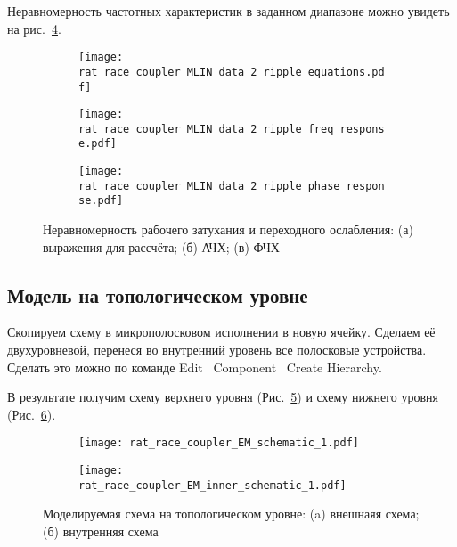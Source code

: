 Неравномерность частотных характеристик в заданном диапазоне можно увидеть на рис.~\ref{fig:rat_race_coupler_MLIN_data_2_response_ripple}.

\begin{figure}[!ht]
    \centering
    \begin{subfigure}[b]{0.4\textwidth}
        \centering
        \texttt{[image: rat\_race\_coupler\_MLIN\_data\_2\_ripple\_equations.pdf]}
        \caption{}%
    \label{fig:rat_race_coupler_MLIN_data_2_ripple_equations}
    \end{subfigure}
    \vfill
    \begin{subfigure}[b]{0.40\textwidth}
        \centering
        \texttt{[image: rat\_race\_coupler\_MLIN\_data\_2\_ripple\_freq\_response.pdf]}
        \caption{}%
    \label{fig:rat_race_coupler_MLIN_data_2_ripple_freq_response}
    \end{subfigure}
    \hfill
    \begin{subfigure}[b]{0.50\textwidth}
        \centering
        \texttt{[image: rat\_race\_coupler\_MLIN\_data\_2\_ripple\_phase\_response.pdf]}
        \caption{}%
    \label{fig:rat_race_coupler_MLIN_data_2_ripple_phase_response}
    \end{subfigure}
    \caption{%
        Неравномерность рабочего затухания и переходного ослабления:
        (а) выражения для рассчёта;
        (б) АЧХ;
        (в) ФЧХ
    }%
    \label{fig:rat_race_coupler_MLIN_data_2_response_ripple}
\end{figure}

\subsection{Модель на топологическом уровне}

Скопируем схему в микрополосковом исполнении в новую ячейку. Сделаем её двухуровневой, перенеся во внутренний уровень все полосковые устройства. Сделать это можно по команде Edit \textrightarrow\ Component \textrightarrow\ Create Hierarchy.

В результате получим схему верхнего уровня (Рис.~\ref{fig:rat_race_coupler_EM_schematic}) и схему нижнего уровня (Рис.~\ref{fig:rat_race_coupler_EM_inner_schematic}).

\begin{figure}[!ht]
    \centering
    \begin{subfigure}[b]{0.45\textwidth}
        \centering
        \texttt{[image: rat\_race\_coupler\_EM\_schematic\_1.pdf]}
        \caption{}%
    \label{fig:rat_race_coupler_EM_schematic}
    \end{subfigure}
    \hfill
    \begin{subfigure}[b]{0.45\textwidth}
        \centering
        \texttt{[image: rat\_race\_coupler\_EM\_inner\_schematic\_1.pdf]}
        \caption{}%
    \label{fig:rat_race_coupler_EM_inner_schematic}
    \end{subfigure}
    \caption{%
        Моделируемая схема на топологическом уровне:
        (a) внешнаяя схема;
        (б) внутренняя схема
    }%
    \label{fig:rat_race_coupler_EM_schematics}
\end{figure}

